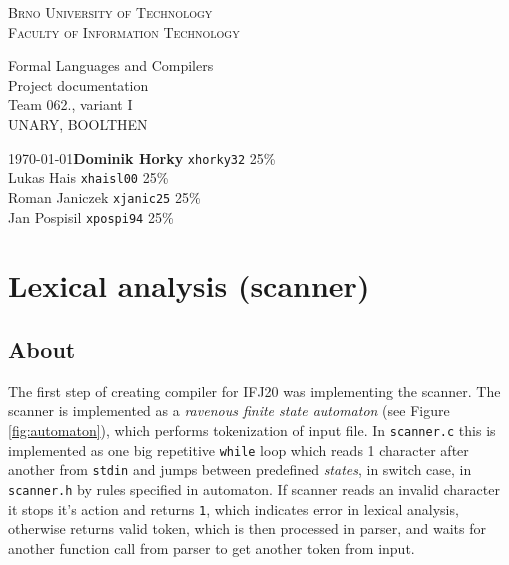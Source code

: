 \documentclass[11pt, titlepage]{article}
\begin{document}
\begin{titlepage}
    \begin{center}
        \textsc{\Huge{Brno University of Technology\\[0.3em]}}
        \textsc{\huge{Faculty of Information Technology}}
        
        
        \Huge{Formal Languages and Compilers\\}
        \huge{Project documentation\\}
        \LARGE{Team 062., variant I\\}
        \Large{UNARY, BOOLTHEN}
        
    \end{center}
    {
    		\Large{\today}{\hfill \textbf{Dominik Horky} \texttt{xhorky32} 25\% \\
    			\phantom{ }\hfill Lukas Hais \texttt{xhaisl00} 25\%\\ 
	    		\phantom{ }\hfill Roman Janiczek \texttt{xjanic25} 25\% \\
    			\phantom{ }\hfill Jan Pospisil \texttt{xpospi94} 25\% \\}
    	}
\end{titlepage}

\tableofcontents
\newpage


\section{Lexical analysis (scanner)}\label{lexical-analysis-scanner}

\subsection{About}\label{about}

The first step of creating compiler for IFJ20 was implementing the
scanner. The scanner is implemented as a \emph{ravenous finite state
automaton} (see Figure \ref{fig:automaton}), which performs tokenization of input file. In
\texttt{scanner.c} this is implemented as one big repetitive
\texttt{while} loop which reads 1 character after another from
\texttt{stdin} and jumps between predefined \emph{states}, in switch
case, in \texttt{scanner.h} by rules specified in automaton. If scanner
reads an invalid character it stops it's action and returns \texttt{1},
which indicates error in lexical analysis, otherwise returns valid
token, which is then processed in parser, and waits for another function call from
parser to get another token from input.
\end{document}

